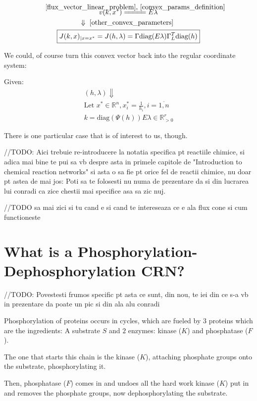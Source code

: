 \begin{gather}\label{jacobian_convex_params}
	v(k, x^*) \eqCuzConvex E \lambda  \notag \\
	\Downarrow \text{ \ref{other_convex_parameters} } \notag \\
	\boxed{J(k,x)_{|x=x^{*}}=J(h,\lambda)=\Gamma \text{diag}(E\lambda)\Gamma_{L}^{T}\text{diag}(h)}
\end{gather}

We could, of course turn this convex vector back into the regular coordinate system:

Given:
\begin{gather*}
	(h,\lambda) \Downarrow \\
	\text{Let  } x^* \in \mathbb{R}^n , \boxed{
		x^*_i = \frac{1}{h_i} , i = \overline{1,n}
	} \\
	\boxed{
		k = \text{diag}(\Psi(h)) E \lambda \in \mathbb{R}^r_{> 0}
 }
\end{gather*}

There is one particular case that is of interest to us, though.

\hfill\break
//TODO: Aici trebuie re-introducere la notatia specifica pt reactiile chimice, si adica mai bine te pui sa vb despre asta in primele capitole de "Introduction to chemical reaction networks"
si asta o sa fie pt orice fel de reactii chimice, nu doar pt astea de mai jos:
Poti sa te folosesti nu numa de prezentare da si din lucrarea lui conradi ca zice chestii mai specifice asa sa zic nuj.

//TODO sa mai zici si tu cand e si cand te intereseaza ce e ala flux cone si cum functioneste
\hfill\break

\section{What is a Phosphorylation-Dephosphorylation CRN?}

\hfill\break
//TODO: Povestesti frumos specific pt asta ce sunt, din nou, te iei din ce s-a vb in prezentare da poate un pic si din ala alu conradi
\hfill\break

Phosphorylation of proteins occurs in cycles, which are fueled by $3$ proteins which are the ingredients: A substrate $S$ and $2$ enzymes: kinase ($K$) and phosphatase ($F$).

The one that starts this chain is the kinase ($K$), attaching phosphate groups onto the substrate, phosphorylating it.

Then, phosphatase ($F$) comes in and undoes all the hard work kinase ($K$) put in and removes the phosphate groups, now dephosphorylating the substrate.

